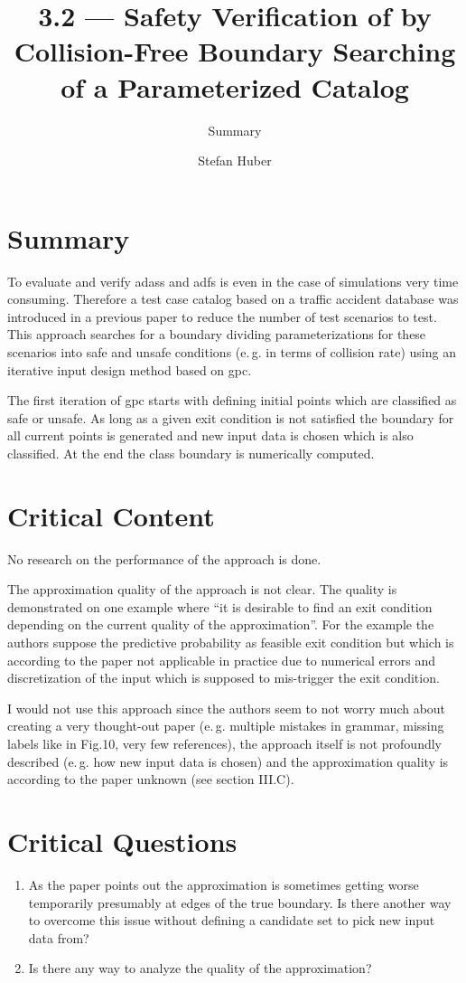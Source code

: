 \documentclass[oneside, notitlepage, twocolumn]{scrartcl}
\title{\LARGE 3.2 --- Safety Verification of \glsname{adas} by Collision-Free Boundary Searching of a Parameterized Catalog}
\subtitle{Summary}
\author{Stefan Huber}
\newcommand{\eg}{e.\,g.\xspace}
\begin{document}
\maketitle

\section{Summary}
To evaluate and verify \glspl{adas} and \glspl{adf} is even in the case of simulations very time consuming.
Therefore a test case catalog based on a traffic accident database was introduced in a previous paper to reduce the number of test scenarios to test.
This approach searches for a boundary dividing parameterizations for these scenarios into safe and unsafe conditions (\eg{} in terms of collision rate) using an iterative input design method based on \gls{gpc}.\par
The first iteration of \gls{gpc} starts with defining initial points which are classified as safe or unsafe.
As long as a given exit condition is not satisfied the boundary for all current points is generated and new input data is chosen which is also classified.
At the end the class boundary is numerically computed.

\section{Critical Content}
No research on the performance of the approach is done.\par
The approximation quality of the approach is not clear.
The quality is demonstrated on one example where ``it is desirable to find an exit condition depending on the current quality of the approximation''.
For the example the authors suppose the predictive probability as feasible exit condition but which is according to the paper not applicable in practice due to numerical errors and discretization of the input which is supposed to mis-trigger the exit condition.\par
I would not use this approach since the authors seem to not worry much about creating a very thought-out paper (\eg{} multiple mistakes in grammar, missing labels like in Fig.10, very few references), the approach itself is not profoundly described (\eg{} how new input data is chosen) and the approximation quality is according to the paper unknown (see section III.C).

\section{Critical Questions}
\begin{enumerate}
    \item As the paper points out the approximation is sometimes getting worse temporarily presumably at edges of the true boundary.
        Is there another way to overcome this issue without defining a candidate set to pick new input data from?
    \item Is there any way to analyze the quality of the approximation?
\end{enumerate}
\end{document}
